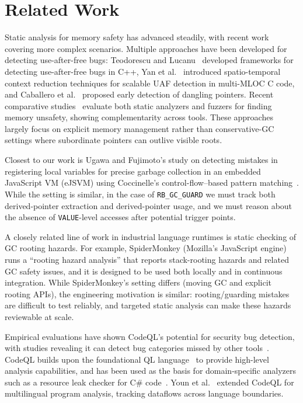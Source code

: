 \section{Related Work}\label{sec:Related}
Static analysis for memory safety has advanced steadily, with recent work covering more complex scenarios. Multiple approaches have been developed for detecting use-after-free bugs: Teodorescu and Lucanu~\cite{static_analysis_use_after_free_cpp} developed frameworks for detecting use-after-free bugs in C++, Yan et al.~\cite{spatio_temporal_context_reduction} introduced spatio-temporal context reduction techniques for scalable UAF detection in multi-MLOC C code, and Caballero et al.~\cite{static_analysis_dangling_pointer} proposed early detection of dangling pointers. Recent comparative studies~\cite{hassler2025comparativestudyfuzzersstatic} evaluate both static analyzers and fuzzers for finding memory unsafety, showing complementarity across tools. These approaches largely focus on explicit memory management rather than conservative-GC settings where subordinate pointers can outlive visible roots.

Closest to our work is Ugawa and Fujimoto's study on detecting mistakes in registering local variables for precise garbage collection in an embedded JavaScript VM (eJSVM) using Coccinelle's control-flow--based pattern matching~\cite{UgawaFujimoto2019PRO}. While the setting is similar, in the case of \texttt{RB\_GC\_GUARD} we must track both derived-pointer extraction and derived-pointer usage, and we must reason about the absence of \texttt{VALUE}-level accesses after potential trigger points.

A closely related line of work in industrial language runtimes is static checking of GC rooting hazards. For example, SpiderMonkey (Mozilla's JavaScript engine) runs a ``rooting hazard analysis'' that reports stack-rooting hazards and related GC safety issues, and it is designed to be used both locally and in continuous integration\cite{spidermonkey_hazard_analysis}. While SpiderMonkey's setting differs (moving GC and explicit rooting APIs), the engineering motivation is similar: rooting/guarding mistakes are difficult to test reliably, and targeted static analysis can make these hazards reviewable at scale.

Empirical evaluations have shown CodeQL's potential for security bug detection, with studies revealing it can detect bug categories missed by other tools~\cite{charoenwet2024empirical}. CodeQL builds upon the foundational QL language~\cite{ql_ecoop} to provide high-level analysis capabilities, and has been used as the basis for domain-specific analyzers such as a resource leak checker for C\# code~\cite{resourceleak_csharp_codeql}. Youn et al.~\cite{codeql_multilingual} extended CodeQL for multilingual program analysis, tracking dataflows across language boundaries.

